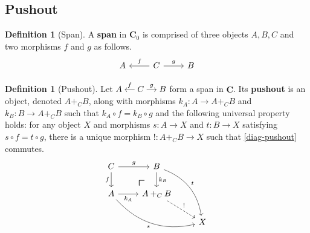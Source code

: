 \documentclass{article}
\theoremstyle{definition}
\newtheorem{defn}[thm]{Definition}
\theoremstyle{remark}
\newcommand{\pushout}{\mbox{\LARGE$\ulcorner$}}
\begin{document}
\subsection{Pushout}
\begin{defn}[Span]
    A \textbf{span} in $\mathbf{C}_0$ is comprised of three objects $A,B,C$ and two morphisms $f$ and $g$ as follows.
    \begin{equation*}
        \begin{tikzcd}
            A & C \arrow[l, "f"'] \arrow[r, "g"]& B 
        \end{tikzcd}
    \end{equation*}
\end{defn}
\begin{defn}[Pushout]
    Let $\begin{tikzcd}[cramped, sep=small]A & C \arrow[l, "f"'] \arrow[r, "g"]& B \end{tikzcd}$ form a span in $\mathbf{C}$. Its \textbf{pushout} is an object, denoted $A +_C B$, along with morphisms $k_A:A \rightarrow A+_C B$ and $k_B:B \rightarrow A+_C B$ such that $k_A \circ f= k_B \circ g$ and the following universal property holds: for any object $X$ and morphisms $s: A \rightarrow X$ and $t: B \rightarrow X$ satisfying $s \circ f = t \circ g$, there is a unique morphism $!:A+_C B \rightarrow X$ such that \eqref{diag-pushout} commutes.
    \begin{equation}\label{diag-pushout}
        \begin{tikzcd}
            C \arrow[d, "f"'] \arrow[r, "g"] \arrow[dr, phantom, "\pushout", very near end] & B \arrow[d, "k_B"] \arrow[rdd, "t", bend left] &   \\
            A \arrow[r, "k_A"'] \arrow[rrd, "s"', bend right] & A+_CB \arrow[rd, "!", dashed]    &   \\
            &  & X
        \end{tikzcd}
    \end{equation}
\end{defn}
\end{document}
